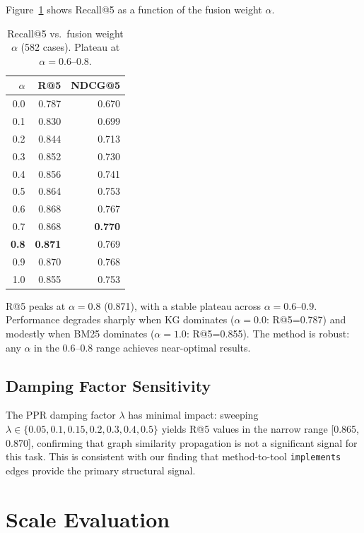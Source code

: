 \documentclass[11pt,a4paper]{article}
\begin{document}
Figure~\ref{fig:alpha-sweep} shows Recall@5 as a function of the fusion weight $\alpha$.

\begin{table}[t]
\centering
\caption{Recall@5 vs.\ fusion weight $\alpha$ (582 cases). Plateau at $\alpha=0.6$--$0.8$.}
\label{fig:alpha-sweep}
\begin{tabular}{rrr}
\toprule
$\alpha$ & R@5 & NDCG@5 \\
\midrule
0.0 & 0.787 & 0.670 \\
0.1 & 0.830 & 0.699 \\
0.2 & 0.844 & 0.713 \\
0.3 & 0.852 & 0.730 \\
0.4 & 0.856 & 0.741 \\
0.5 & 0.864 & 0.753 \\
0.6 & 0.868 & 0.767 \\
0.7 & 0.868 & \textbf{0.770} \\
\textbf{0.8} & \textbf{0.871} & 0.769 \\
0.9 & 0.870 & 0.768 \\
1.0 & 0.855 & 0.753 \\
\bottomrule
\end{tabular}
\end{table}

R@5 peaks at $\alpha=0.8$ (0.871), with a stable plateau across $\alpha=0.6$--$0.9$. Performance degrades sharply when KG dominates ($\alpha=0.0$: R@5=0.787) and modestly when BM25 dominates ($\alpha=1.0$: R@5=0.855). The method is robust: any $\alpha$ in the 0.6--0.8 range achieves near-optimal results.

\subsection{Damping Factor Sensitivity}

The PPR damping factor $\lambda$ has minimal impact: sweeping $\lambda \in \{0.05, 0.1, 0.15, 0.2, 0.3, 0.4, 0.5\}$ yields R@5 values in the narrow range [0.865, 0.870], confirming that graph similarity propagation is not a significant signal for this task. This is consistent with our finding that method-to-tool \texttt{implements} edges provide the primary structural signal.

\section{Scale Evaluation}
\label{sec:scale}
\end{document}
